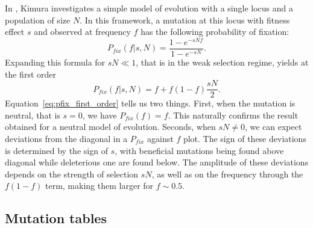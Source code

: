 \documentclass[reprint,amsmath,amssymb,superscriptaddress,showpacs,rmp]{revtex4-1}
\begin{document}
In \citep{kimura_diffusion_1964}, Kimura investigates a simple model of evolution with a single locus and a population of size $N$. 
In this framework, a mutation at this locus with fitness effect $s$ and observed at frequency $f$ has the following probability of fixation: 
\begin{equation}
    P_{fix}(f\vert s,N) = \frac{1-e^{-sNf}}{1-e^{-sN}}.
\end{equation}
Expanding this formula for $sN\ll 1$, that is in the weak selection regime, yields at the first order
\begin{equation}
    P_{fix}(f\vert s,N) = f + f(1-f)\frac{sN}{2}.
    \label{eq:pfix_first_order}
\end{equation}
Equation~\ref{eq:pfix_first_order} tells us two things. First, when the mutation is neutral, that is $s=0$, we have $P_{fix}(f) = f$. 
This naturally confirms the result obtained for a neutral model of evolution.
Seconds, when $sN\neq 0$, we can expect deviations from the diagonal in a $P_{fix}$ against $f$ plot. 
The sign of these deviations is determined by the sign of $s$, with beneficial mutations being found above diagonal while deleterious one are found below. 
The amplitude of these deviations depends on the strength of selection $sN$, as well as on the frequency through the $f(1-f)$ term, making them larger for $f\sim 0.5$. 




\newpage
\subsection{Mutation tables}
\end{document}
